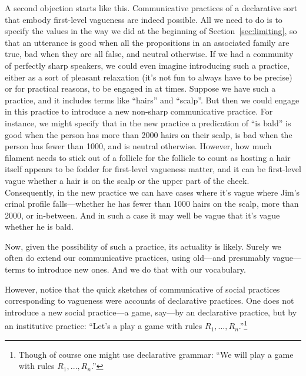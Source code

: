 A second objection starts like this. Communicative practices of a declarative sort that embody first-level vagueness are indeed possible. All we 
need to do is to specify the values in the way we did at the beginning of Section~\ref{sec:limiting}, so that an utterance is 
good when all the propositions in an associated family are true, bad when they are all false, and neutral otherwise. If we had
a community of perfectly sharp speakers, we could even imagine introducing such a practice, either as a sort of pleasant relaxation
(it's not fun to always have to be precise) or for practical reasons, to be engaged in at times. Suppose we have such a practice, and it
includes terms like ``hairs'' and ``scalp''. But then we could engage in this practice to introduce a new non-sharp
communicative practice. For instance, we might specify that in the new practice a predication of ``is bald'' is good when 
the person has more than 2000 hairs on their scalp, is bad when the person has fewer than 1000, and is neutral otherwise. However, 
how much filament  needs to stick out of a follicle for the follicle to count as hosting a hair itself appears to be fodder for 
first-level vagueness matter, and it can be first-level vague whether a hair is on the scalp or the upper part of the cheek.
Consequently, in the new practice we can have cases where it's vague where Jim's crinal profile falls---whether he has fewer than 
1000 hairs on the scalp, more than 2000, or in-between. And in such a case it may well be vague that it's vague whether he is bald.

Now, given the possibility of such a practice, its actuality is likely. Surely we often do extend our communicative practices,
using old---and presumably vague---terms to introduce new ones. And we do that with our vocabulary.

However, notice that the quick sketches of communicative of social practices corresponding to vagueness were accounts of declarative
practices. One does not introduce a new social practice---a game, say---by an declarative practice, but by an
institutive practice: ``Let's a play a game with rules $R_1,...,R_n$.''\footnote{Though of course one might
use declarative grammar: ``We will play a game with rules $R_1,...,R_n$.''} 

